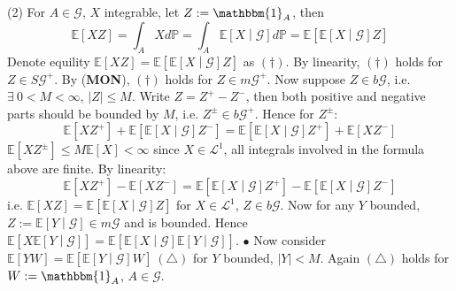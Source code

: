 \documentclass[a4paper,12pt,twoside]{book}
\begin{document}
\begin{itemize}
\begin{itemize}
	(2) For $A \in \mathcal{G}$, $X$ integrable, let $Z:= \mathbbm{1}_{A}$, then
	\begin{equation}
		\mathbb{E}\left[XZ\right]=\int_A X d\mathbb{P} = \int_A \mathbb{E}\left[X\middle|\mathcal{G}\right] d\mathbb{P} = \mathbb{E}\left[\mathbb{E}\left[X\middle|\mathcal{G}\right]Z\right]
	\end{equation}
	Denote equility $\mathbb{E}\left[XZ\right]=\mathbb{E}\left[\mathbb{E}\left[X\middle|\mathcal{G}\right]Z\right]$ as $(\dagger)$. \newline
	By linearity, $(\dagger)$ holds for $Z\in S \mathcal{G}^+$. \newline
	By (\textbf{MON}), $(\dagger)$ holds for $Z\in m \mathcal{G}^+$.\newline
	Now suppose $Z\in b \mathcal{G}$, i.e. $\exists~0<M<\infty$, $|Z|\leq M$. Write $Z=Z^+ - Z^-$, then both positive and negative parts should be bounded by $M$, i.e. $Z^{\pm}\in b \mathcal{G}^+$. Hence for $Z^{\pm}$:
	\begin{equation}
		\mathbb{E}\left[XZ^+\right]+\mathbb{E}\left[\mathbb{E}\left[X\middle|\mathcal{G}\right]Z^-\right]=\mathbb{E}\left[\mathbb{E}\left[X\middle|\mathcal{G}\right]Z^+\right]+\mathbb{E}\left[XZ^-\right]
	\end{equation}
	$\mathbb{E}\left[XZ^{\pm}\right]\leq M \mathbb{E}\left[X\right]<\infty$ since $X \in \mathcal{L}^1$, all integrals involved in the formula above are finite. By linearity:
	\begin{equation}
		\mathbb{E}\left[XZ^+\right]-\mathbb{E}\left[XZ^-\right]=\mathbb{E}\left[\mathbb{E}\left[X\middle|\mathcal{G}\right]Z^+\right]-\mathbb{E}\left[\mathbb{E}\left[X\middle|\mathcal{G}\right]Z^-\right]
	\end{equation}
	i.e. $\mathbb{E}\left[XZ\right]=\mathbb{E}\left[\mathbb{E}\left[X\middle|\mathcal{G}\right]Z\right]$ for $X\in \mathcal{L}^1$, $Z\in b \mathcal{G}$. Now for any $Y$ bounded, $Z:=\mathbb{E}\left[Y\middle|\mathcal{G}\right]\in m \mathcal{G}$ and is bounded. Hence $\mathbb{E}\left[X \mathbb{E}\left[Y\middle|\mathcal{G}\right]\right]=\mathbb{E}\left[\mathbb{E}\left[X\middle|\mathcal{G}\right] \mathbb{E}\left[Y\middle|\mathcal{G}\right]\right]$.\newline
	$\bullet$ Now consider $\mathbb{E}\left[YW\right]=\mathbb{E}\left[\mathbb{E}\left[Y\middle|\mathcal{G}\right]W\right]~(\triangle)$ for $Y$ bounded, $|Y|<M$.\newline
	Again $(\triangle)$ holds for $W:=\mathbbm{1}_{A}$, $A\in \mathcal{G}$.\newline

\end{itemize}
\end{itemize}
\end{document}
